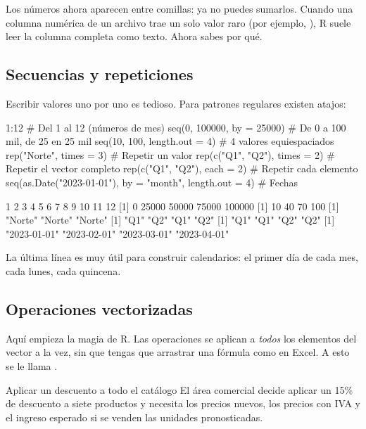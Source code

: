 Los números ahora aparecen entre comillas: ya no puedes sumarlos. Cuando
una columna numérica de un archivo trae un solo valor raro (por ejemplo,
), R suele leer la columna completa como texto. Ahora sabes
por qué.

\subsection{Secuencias y repeticiones}

Escribir valores uno por uno es tedioso. Para patrones regulares existen
atajos:

\begin{rcode}
1:12                                   # Del 1 al 12 (números de mes)
seq(0, 100000, by = 25000)             # De 0 a 100 mil, de 25 en 25 mil
seq(10, 100, length.out = 4)           # 4 valores equiespaciados
rep("Norte", times = 3)                # Repetir un valor
rep(c("Q1", "Q2"), times = 2)          # Repetir el vector completo
rep(c("Q1", "Q2"), each = 2)           # Repetir cada elemento
seq(as.Date("2023-01-01"), by = "month", length.out = 4)  # Fechas
\end{rcode}
\begin{rsalida}
 [1]  1  2  3  4  5  6  7  8  9 10 11 12
[1]      0  25000  50000  75000 100000
[1]  10  40  70 100
[1] "Norte" "Norte" "Norte"
[1] "Q1" "Q2" "Q1" "Q2"
[1] "Q1" "Q1" "Q2" "Q2"
[1] "2023-01-01" "2023-02-01" "2023-03-01" "2023-04-01"
\end{rsalida}

La última línea es muy útil para construir calendarios: el primer día de
cada mes, cada lunes, cada quincena.

\subsection{Operaciones vectorizadas}

Aquí empieza la magia de R. Las operaciones se aplican a \emph{todos} los
elementos del vector a la vez, sin que tengas que arrastrar una fórmula
como en Excel. A esto se le llama .

\begin{ejemplo}{Aplicar un descuento a todo el catálogo}
El área comercial decide aplicar un 15\% de descuento a siete productos y
necesita los precios nuevos, los precios con IVA y el ingreso esperado si
se venden las unidades pronosticadas.
\end{ejemplo}

